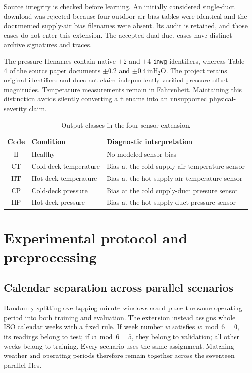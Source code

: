 Source integrity is checked before learning. An initially considered single-duct download was rejected because four outdoor-air bias tables were identical and the documented supply-air bias filenames were absent. Its audit is retained, and those cases do not enter this extension. The accepted dual-duct cases have distinct archive signatures and traces.

The pressure filenames contain native $\pm2$ and $\pm4$ \texttt{inwg} identifiers, whereas Table 4 of the source paper documents $\pm0.2$ and $\pm0.4\,\mathrm{inH_2O}$. The project retains original identifiers and does not claim independently verified pressure offset magnitudes. Temperature measurements remain in Fahrenheit. Maintaining this distinction avoids silently converting a filename into an unsupported physical-severity claim.

\begin{table}[htbp]\centering\small
\caption{Output classes in the four-sensor extension.}\label{tab:classes}
\begin{tabularx}{\linewidth}{c l X}
\toprule
Code & Condition & Diagnostic interpretation \\
\midrule
H & Healthy & No modeled sensor bias \\
CT & Cold-deck temperature & Bias at the cold supply-air temperature sensor \\
HT & Hot-deck temperature & Bias at the hot supply-air temperature sensor \\
CP & Cold-deck pressure & Bias at the cold supply-duct pressure sensor \\
HP & Hot-deck pressure & Bias at the hot supply-duct pressure sensor \\
\bottomrule\end{tabularx}
\end{table}

\section{Experimental protocol and preprocessing}
\subsection{Calendar separation across parallel scenarios}
Randomly splitting overlapping minute windows could place the same operating period into both training and evaluation. The extension instead assigns whole ISO calendar weeks with a fixed rule. If week number $w$ satisfies $w\bmod6=0$, its readings belong to test; if $w\bmod6=5$, they belong to validation; all other weeks belong to training. Every scenario uses the same assignment. Matching weather and operating periods therefore remain together across the seventeen parallel files.

